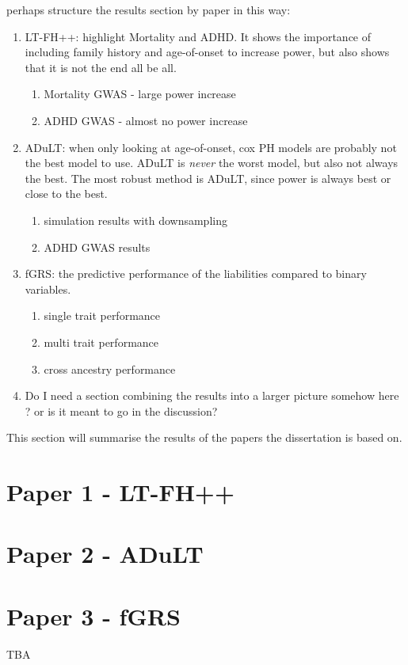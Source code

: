 


perhaps structure the results section by paper in this way:

\begin{enumerate}
	\item LT-FH++: highlight Mortality and ADHD. It shows the importance of including family history and age-of-onset to increase power, but also shows that it is not the end all be all.
	\begin{enumerate}
		\item Mortality GWAS - large power increase
		\item ADHD GWAS - almost no power increase
	\end{enumerate}
	\item ADuLT: when only looking at age-of-onset, cox PH models are probably not the best model to use. ADuLT is \textit{never} the worst model, but also not always the best. The most robust method is ADuLT, since power is always best or close to the best.
	\begin{enumerate}
		\item simulation results with downsampling
		\item ADHD GWAS results
	\end{enumerate}
	\item fGRS: the predictive performance of the liabilities compared to binary variables.
	\begin{enumerate}
		\item single trait performance
		\item multi trait performance 
		\item cross ancestry performance
	\end{enumerate}	
\item Do I need a section combining the results into a larger picture somehow here ? or is it meant to go in the discussion?
\end{enumerate}


This section will summarise the results of the papers the dissertation is based on.

\section{Paper 1 - LT-FH++}

\newpage

\section{Paper 2 - ADuLT}

\newpage

\section{Paper 3 - fGRS}
TBA
%